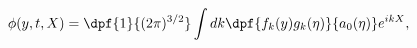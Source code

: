 \begin{equation} %
\phi(y,t,X)=\dpf{1}{(2\pi)^{3/2}}\int dk \dpf{f_{k}(y)g_{k}(\eta)}{a_0(\eta)}e^{ikX},
\end{equation}

